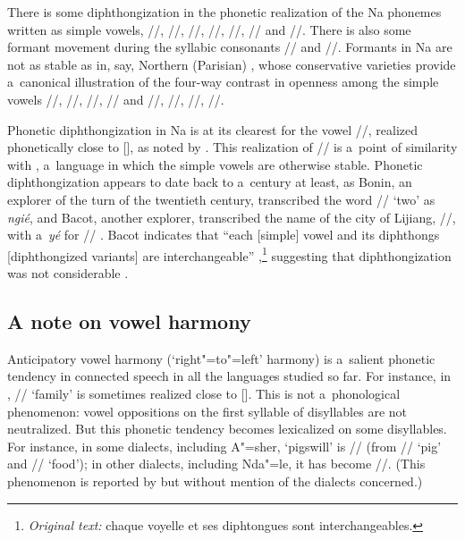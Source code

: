 			There is some diphthongization in the phonetic realization of the Na phonemes written as simple vowels, //, //, //, //, //, // and //. There is also some formant movement during the syllabic consonants // and //. Formants in Na are not as stable as in, say, Northern (Parisian) , whose {conservative} varieties provide a~canonical illustration of the four-way contrast in openness among the simple vowels //, //, //, // and //, //, //, //. 
			
			Phonetic diphthongization in Na is at its clearest for the vowel //, realized phonetically close to [], as noted by \citet[63, 96]{lidz2010}. This realization of // is a~point of similarity with , a~language in which the simple vowels are otherwise stable. Phonetic diphthongization appears to date back to a~century at least, as Bonin, an explorer of the turn of the twentieth century, transcribed the  word /{\kern1pt}/ ‘two’ as \textit{ngié}, and Bacot, another explorer, transcribed the  name of the city of Lijiang, //, with a~\textit{yé} for // \citep[3]{bacot1913}. Bacot indicates that “each [simple] vowel and its diphthongs [diphthongized variants] are interchangeable” \citep[28]{bacot1913},\footnote{\textit{Original text:} chaque voyelle et ses diphtongues sont interchangeables.} suggesting that diphthongization was not considerable \citep{michaudetal2010}.
			

			\subsection{A note on vowel harmony}
			\label{sec:anoteonvowelharmony}
			
			Anticipatory vowel harmony (‘right"=to"=left’ harmony) is a~salient phonetic tendency in connected
			speech in all the  languages studied so far. For instance, in , // ‘family’ is
			sometimes realized close to [{\kern1.3pt}]. This is not a~phonological phenomenon: vowel oppositions
			on the first syllable of disyllables are not neutralized. But this phonetic tendency becomes
			lexicalized on some disyllables. For instance, in some  dialects, including A"=sher, ‘pigswill’ is // (from // ‘pig’
			and // ‘food’); in other dialects, including
			Nda"=le, it has become //. (This phenomenon is reported by \citealt[11]{he1985} but
			without mention of the dialects concerned.)
			
